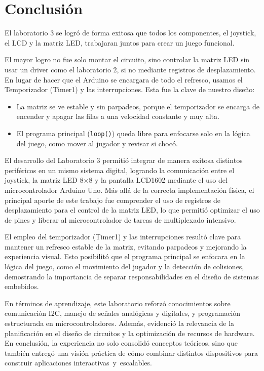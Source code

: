\section{Conclusión}
El laboratorio 3 se logró de forma exitosa que todos los componentes, el joystick, el LCD y la matriz LED, trabajaran juntos para crear un juego funcional.

El mayor logro no fue solo montar el circuito, sino controlar la matriz LED sin usar un driver como el laboratorio 2, si no mediante  registros de desplazamiento. En lugar de hacer que el Arduino se encargara de todo el refresco, usamos el Temporizador (Timer1) y las interrupciones.  Esta fue la clave de nuestro diseño:
\begin{itemize}
    \item La matriz se ve estable y sin parpadeos, porque el temporizador se encarga de encender y apagar las filas a una velocidad constante y muy alta.
        \item El programa principal (\texttt{loop()}) queda libre para enfocarse solo en la lógica del juego, como mover al jugador y revisar si chocó.
        \end{itemize}

El desarrollo del Laboratorio 3 permitió integrar de manera exitosa distintos periféricos en un mismo sistema digital, logrando la comunicación entre el joystick, la matriz LED 8×8 y la pantalla LCD1602 mediante el uso del microcontrolador Arduino Uno. Más allá de la correcta implementación física, el principal aporte de este trabajo fue comprender el uso de registros de desplazamiento para el control de la matriz LED, lo que permitió optimizar el uso de pines y liberar al microcontrolador de tareas de multiplexado intensivo.

El empleo del temporizador (Timer1) y las interrupciones resultó clave para mantener un refresco estable de la matriz, evitando parpadeos y mejorando la experiencia visual. Esto posibilitó que el programa principal se enfocara en la lógica del juego, como el movimiento del jugador y la detección de colisiones, demostrando la importancia de separar responsabilidades en el diseño de sistemas embebidos.

En términos de aprendizaje, este laboratorio reforzó conocimientos sobre comunicación I2C, manejo de señales analógicas y digitales, y programación estructurada en microcontroladores. Además, evidenció la relevancia de la planificación en el diseño de circuitos y la optimización de recursos de hardware. En conclusión, la experiencia no solo consolidó conceptos teóricos, sino que también entregó una visión práctica de cómo combinar distintos dispositivos para construir aplicaciones interactivas y escalables.
